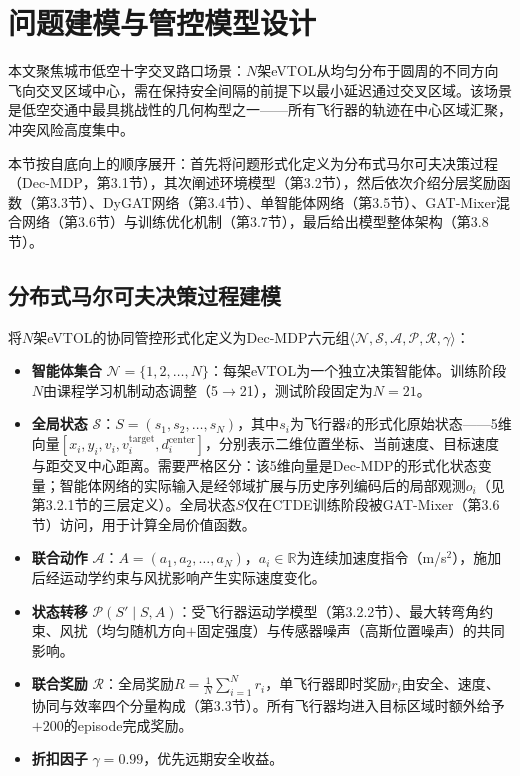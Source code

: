\documentclass[12pt,a4paper,UTF8]{ctexart}
\begin{document}
\section{问题建模与管控模型设计}

本文聚焦城市低空十字交叉路口场景：$N$架eVTOL从均匀分布于圆周的不同方向飞向交叉区域中心，需在保持安全间隔的前提下以最小延迟通过交叉区域。该场景是低空交通中最具挑战性的几何构型之一——所有飞行器的轨迹在中心区域汇聚，冲突风险高度集中。

本节按自底向上的顺序展开：首先将问题形式化定义为分布式马尔可夫决策过程（Dec-MDP，第3.1节），其次阐述环境模型（第3.2节），然后依次介绍分层奖励函数（第3.3节）、DyGAT网络（第3.4节）、单智能体网络（第3.5节）、GAT-Mixer混合网络（第3.6节）与训练优化机制（第3.7节），最后给出模型整体架构（第3.8节）。

\subsection{分布式马尔可夫决策过程建模}

将$N$架eVTOL的协同管控形式化定义为Dec-MDP六元组$\langle \mathcal{N}, \mathcal{S}, \mathcal{A}, \mathcal{P}, \mathcal{R}, \gamma \rangle$：

\begin{itemize}
    \item \textbf{智能体集合} $\mathcal{N} = \{1, 2, \ldots, N\}$：每架eVTOL为一个独立决策智能体。训练阶段$N$由课程学习机制动态调整（5$\to$21），测试阶段固定为$N=21$。
    \item \textbf{全局状态} $\mathcal{S}$：$S = (s_1, s_2, \ldots, s_N)$，其中$s_i$为飞行器$i$的形式化原始状态——5维向量$[x_i, y_i, v_i, v_i^{\text{target}}, d_i^{\text{center}}]$，分别表示二维位置坐标、当前速度、目标速度与距交叉中心距离。需要严格区分：该5维向量是Dec-MDP的形式化状态变量；智能体网络的实际输入是经邻域扩展与历史序列编码后的局部观测$o_i$（见第3.2.1节的三层定义）。全局状态$S$仅在CTDE训练阶段被GAT-Mixer（第3.6节）访问，用于计算全局价值函数。
    \item \textbf{联合动作} $\mathcal{A}$：$A = (a_1, a_2, \ldots, a_N)$，$a_i \in \mathbb{R}$为连续加速度指令（m/s$^2$），施加后经运动学约束与风扰影响产生实际速度变化。
    \item \textbf{状态转移} $\mathcal{P}(S' \mid S, A)$：受飞行器运动学模型（第3.2.2节）、最大转弯角约束、风扰（均匀随机方向$+$固定强度）与传感器噪声（高斯位置噪声）的共同影响。
    \item \textbf{联合奖励} $\mathcal{R}$：全局奖励$R = \frac{1}{N}\sum_{i=1}^{N} r_i$，单飞行器即时奖励$r_i$由安全、速度、协同与效率四个分量构成（第3.3节）。所有飞行器均进入目标区域时额外给予$+200$的episode完成奖励。
    \item \textbf{折扣因子} $\gamma = 0.99$，优先远期安全收益。
\end{itemize}
\end{document}
